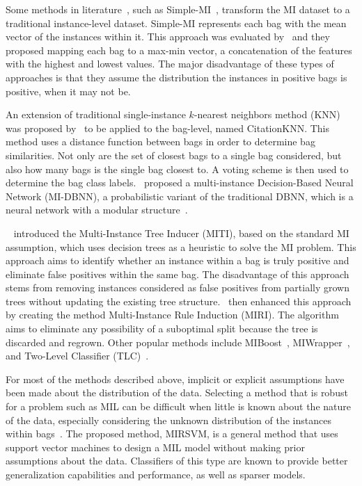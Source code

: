 \documentclass[preprint,12pt]{elsarticle}
\begin{document}
Some methods in literature~\citep{Ray2005,Viola2005}, such as Simple-MI~\citep{Dong2006}, transform the MI dataset to a traditional instance-level dataset. Simple-MI represents each bag with the mean vector of the instances within it. This approach was evaluated by~\citet{Bunescu2007} and they proposed mapping each bag to a max-min vector, a concatenation of the features with the highest and lowest values. The major disadvantage of these types of approaches is that they assume the distribution the instances in positive bags is positive, when it may not be.

An extension of traditional single-instance $k$-nearest neighbors method (KNN) was proposed by~\citet{Wang2000} to be applied to the bag-level, named CitationKNN. This method uses a distance function between bags in order to determine bag similarities. Not only are the set of closest bags to a single bag  considered, but also how many bags is the single bag closest to. A voting scheme is then used to determine the bag class labels.~\citet{Xu2011} proposed a multi-instance Decision-Based Neural Network (MI-DBNN), a probabilistic variant of the traditional DBNN, which is a neural network with a modular structure~\citep{Herrera2016}.

~\citet{Blockeel2005} introduced the Multi-Instance Tree Inducer (MITI), based on the standard MI assumption, which uses decision trees as a heuristic to solve the MI problem. This approach aims to identify whether an instance within a bag is truly positive and eliminate false positives within the same bag. The disadvantage of this approach stems from removing instances considered as false positives from partially grown trees without updating the existing tree structure.~\citet{Bjerring2011} then enhanced this approach by creating the method Multi-Instance Rule Induction (MIRI). The algorithm aims to eliminate any possibility of a suboptimal split because the tree is discarded and regrown. Other popular methods include MIBoost~\citep{Hall2009}, MIWrapper~\citep{Frank2003}, and Two-Level Classifier (TLC)~\citep{Wang2014}.

For most of the methods described above, implicit or explicit assumptions have been made about the distribution of the data. Selecting a method that is robust for a problem such as MIL can be difficult when little is known about the nature of the data, especially considering the unknown distribution of the instances within bags~\citep{2015-KAIS,2016-INS-MIARM}. The proposed method, MIRSVM, is a general method that uses support vector machines to design a MIL model without making prior assumptions about the data. Classifiers of this type are known to provide better generalization capabilities and performance, as well as sparser models.
\end{document}
